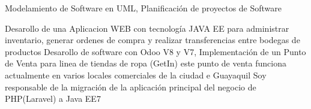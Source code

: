 {Modelamiento de Software en UML, Planificación de proyectos de Software}

{Desarollo de una Aplicacion WEB con tecnología JAVA EE para administrar inventario, generar ordenes de compra y realizar transferencias entre bodegas de productos \newline
}
{Desarollo de software con Odoo V8 y V7, Implementación de un Punto de Venta para linea de tiendas de ropa (GetIn) este punto de venta funciona actualmente en varios locales comerciales de la ciudad e Guayaquil}
{Soy responsable de la migración de la aplicación principal del negocio de PHP(Laravel) a Java EE7 }
